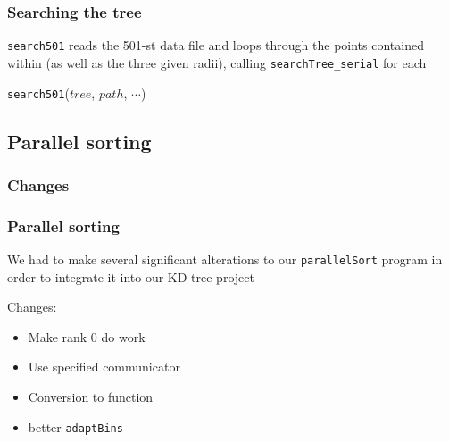 \documentclass[usernames,dvipsnames]{beamer}
\begin{document}
\begin{frame}
	\frametitle{Searching the tree}
	
	\texttt{search501} reads the 501-st data file and loops through the points contained within (as well as the three given radii), calling \texttt{searchTree\_serial} for each
	
	\vspace{10pt}
	
	\begin{algorithm}[H]
		\begin{algorithmic}[1]
			\STATE 
		\end{algorithmic}
		\caption{\texttt{search501}($tree$, $path$, $\cdots$)}
	\end{algorithm}
		
\end{frame}


\subsection{Parallel sorting}


\subsubsection{Changes}

\begin{frame}
	\frametitle{Parallel sorting}
	
	We had to make several significant alterations to our \texttt{parallelSort} program in order to integrate it into our KD tree project
	
	\vspace{10pt}
	
	\begin{block}{Changes:}
		\begin{itemize}
			\item Make rank 0 do work
			\item Use specified communicator
			\item Conversion to function
			\item better \texttt{adaptBins}
		\end{itemize}
	\end{block}
\end{frame}
\end{document}
